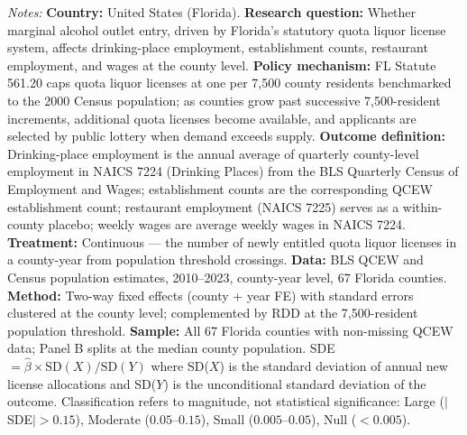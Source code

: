 \begin{table}[htbp]
\begin{tablenotes}
\item \textit{Notes:} \textbf{Country:} United States (Florida). \textbf{Research question:} Whether marginal alcohol outlet entry, driven by Florida's statutory quota liquor license system, affects drinking-place employment, establishment counts, restaurant employment, and wages at the county level. \textbf{Policy mechanism:} FL Statute 561.20 caps quota liquor licenses at one per 7,500 county residents benchmarked to the 2000 Census population; as counties grow past successive 7,500-resident increments, additional quota licenses become available, and applicants are selected by public lottery when demand exceeds supply. \textbf{Outcome definition:} Drinking-place employment is the annual average of quarterly county-level employment in NAICS 7224 (Drinking Places) from the BLS Quarterly Census of Employment and Wages; establishment counts are the corresponding QCEW establishment count; restaurant employment (NAICS 7225) serves as a within-county placebo; weekly wages are average weekly wages in NAICS 7224. \textbf{Treatment:} Continuous --- the number of newly entitled quota liquor licenses in a county-year from population threshold crossings. \textbf{Data:} BLS QCEW and Census population estimates, 2010--2023, county-year level, 67 Florida counties. \textbf{Method:} Two-way fixed effects (county + year FE) with standard errors clustered at the county level; complemented by RDD at the 7,500-resident population threshold. \textbf{Sample:} All 67 Florida counties with non-missing QCEW data; Panel B splits at the median county population. SDE $= \hat{\beta} \times \text{SD}(X) / \text{SD}(Y)$ where SD($X$) is the standard deviation of annual new license allocations and SD($Y$) is the unconditional standard deviation of the outcome. Classification refers to magnitude, not statistical significance: Large ($|$SDE$| > 0.15$), Moderate ($0.05$--$0.15$), Small ($0.005$--$0.05$), Null ($< 0.005$).
\end{tablenotes}
\end{table}
